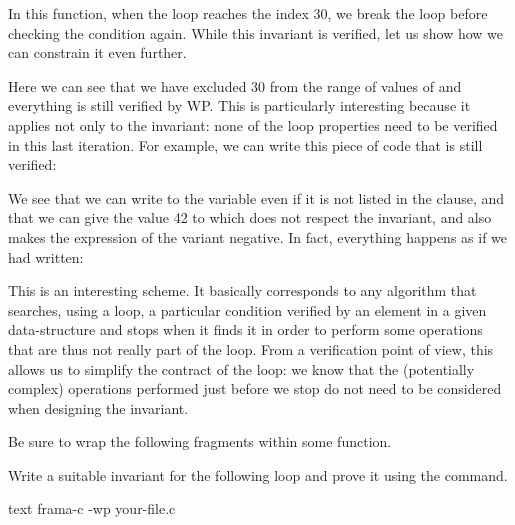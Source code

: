 


In this function, when the loop reaches the index 30, we break the loop before
checking the condition again. While this invariant is verified, let us show
how we can constrain it even further.






Here we can see that we have excluded 30 from the range of values of
 and everything is still verified by WP. This is particularly
interesting because it applies not only to the invariant: none of the loop
properties need to be verified in this last iteration. For example, we can
write this piece of code that is still verified:






We see that we can write to the variable  even if it is not
listed in the  clause, and that we can give the
value 42 to  which does not respect the invariant, and also
makes the expression of the variant negative. In fact, everything happens
as if we had written:






This is an interesting scheme. It basically corresponds to any algorithm
that searches, using a loop, a particular condition verified by an element
in a given data-structure and stops when it finds it in order to perform some
operations that are thus not really part of the loop. From a verification
point of view, this allows us to simplify the contract of the loop: we know
that the (potentially complex) operations performed just before we stop do
not need to be considered when designing the invariant.



Be sure to wrap the following fragments within some function.




Write a suitable invariant for the following loop and prove it using
the command.

\begin{CodeBlock}{text}
frama-c -wp your-file.c
\end{CodeBlock}


